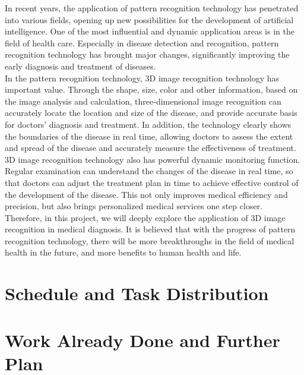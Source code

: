 \documentclass[12pt,a4paper]{report}
\begin{document}
\qquad In recent years, the application of pattern recognition technology has penetrated into various fields, opening up new possibilities for the development of artificial intelligence.
One of the most influential and dynamic application areas is in the field of health care. Especially in disease detection and recognition, pattern recognition technology has brought major
changes, significantly improving the early diagnosis and treatment of diseases.\\

\qquad In the pattern recognition technology, 3D image recognition technology has important value. Through the shape, size, color and other information, based on the image analysis
and calculation, three-dimensional image recognition can accurately locate the location and size of the disease, and provide accurate basis for doctors' diagnosis and treatment.
In addition, the technology clearly shows the boundaries of the disease in real time, allowing doctors to assess the extent and spread of the disease and accurately measure the
effectiveness of treatment.\\

\qquad 3D image recognition technology also has powerful dynamic monitoring function. Regular examination can understand the changes of the disease in real time, so that doctors can adjust
the treatment plan in time to achieve effective control of the development of the disease. This not only improves medical efficiency and precision, but also brings personalized medical
services one step closer.\\

\qquad Therefore, in this project, we will deeply explore the application of 3D image recognition in medical diagnosis. It is believed that with the progress of pattern recognition technology,
there will be more breakthroughs in the field of medical health in the future, and more benefits to human health and life.

\section{Schedule and Task Distribution}

\section{Work Already Done and Further Plan}
\end{document}
